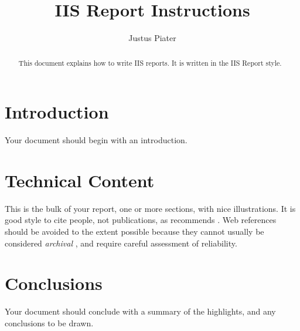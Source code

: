 \documentclass[703035]{iisreport}
\title{IIS Report Instructions}
\author{Justus Piater}
\begin{document}
\maketitle

\begin{abstract}
  This document explains how to write IIS reports. It is written in the IIS Report style.
\end{abstract}

\section{Introduction}

Your document should begin with an introduction.

\section{Technical Content}

This is the bulk of your report, one or more sections, with nice illustrations. It is good style to cite people, not publications, as recommends \cite{Piater-2011-IISreport}. Web references should be avoided to the extent possible because they cannot usually be considered \emph{archival} \citep{Wikipedia-Archive}, and require careful assessment of reliability.

\section{Conclusions}

Your document should conclude with a summary of the highlights, and any conclusions to be drawn.


\end{document}
